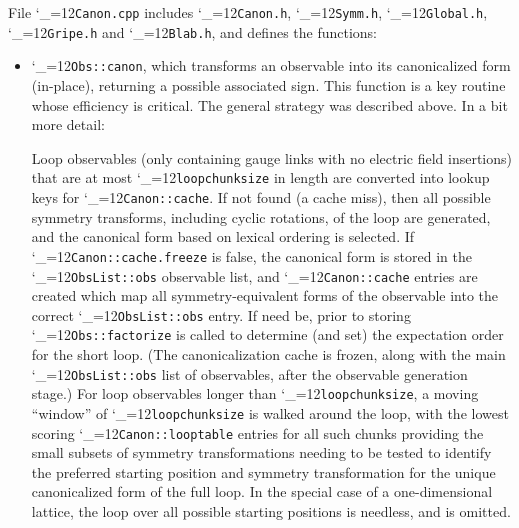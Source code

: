 \documentclass [12pt]{article}
\makeatletter
\renewcommand{\tt}{\begingroup\catcode`_=12\def\_{\string_}\tt@}
\newcommand{\tt@}[1]{\texttt{#1}\endgroup}
\makeatother
\begin{document}
File \tt{Canon.cpp} includes
\tt{Canon.h},
\tt{Symm.h},
\tt{Global.h},
\tt{Gripe.h} and
\tt{Blab.h},
and defines the functions:
\begin{itemize}

\item
    \tt{Obs::canon}, which transforms an observable
    into its canonicalized form (in-place), returning
    a possible associated sign.
    This function is a key routine whose efficiency is critical.
    The general strategy was described above.
    In a bit more detail:

    Loop observables (only containing gauge links with no
    electric field insertions) that are at most
    \tt{loopchunksize} in length 
    are converted into lookup keys for
    \tt{Canon::cache}.
    If not found (a cache miss), then all possible
    symmetry transforms, including cyclic rotations,
    of the loop are generated, and
    the canonical form based on lexical ordering is selected.
    If \tt{Canon::cache.freeze} is false, the canonical form is
    stored in the \tt{ObsList::obs} observable list,
    and \tt{Canon::cache} entries are created which map
    all symmetry-equivalent forms of the observable into
    the correct \tt{ObsList::obs} entry.
    If need be, prior to storing \tt{Obs::factorize}
    is called to determine (and set) the expectation
    order for the short loop.
    (The canonicalization cache is frozen,
    along with the main \tt{ObsList::obs} list of
    observables, after the observable generation stage.)
    For loop observables longer than \tt{loopchunksize},
    a moving ``window'' of \tt{loopchunksize} is walked around
    the loop, with the lowest scoring \tt{Canon::looptable}
    entries for all such chunks
    providing the small subsets of symmetry transformations
    needing to be tested to identify the preferred
    starting position and symmetry transformation for the
    unique canonicalized form of the full loop.
    In the special case of a one-dimensional lattice,
    the loop over all possible starting positions is
    needless, and is omitted.


\end{itemize}
\end{document}
